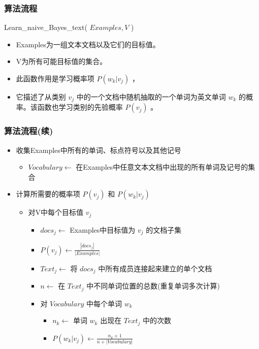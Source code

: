 \documentclass{beamer}
\begin{document}
\begin{frame}
\frametitle{算法流程}
\label{sec-7-10}

Learn\_{}naive\_{}Bayes\_{}text( $Examples, V$ )
\begin{itemize}
\item Examples为一组文本文档以及它们的目标值。
\item V为所有可能目标值的集合。
\item 此函数作用是学习概率项 $P(w_k|v_j)$ ，
\item 它描述了从类别 $v_j$ 中的一个文档中随机抽取的一个单词为英文单词 $w_k$ 的概率。该函数也学习类别的先验概率 $P(v_j)$ 。
\end{itemize}
\end{frame}
\begin{frame}
\frametitle{算法流程(续)}
\label{sec-7-11}

\begin{itemize}
\item 收集Examples中所有的单词、标点符号以及其他记号
\begin{itemize}
\item $Vocabulary \leftarrow$ 在Examples中任意文本文档中出现的所有单词及记号的集合
\end{itemize}
\item 计算所需要的概率项 $P(v_j)$ 和 $P(w_k|v_j)$
\begin{itemize}
\item 对V中每个目标值 $v_j$
\begin{itemize}
\item $docs_{j} \leftarrow$ Examples中目标值为 $v_j$ 的文档子集
\item $P(v_{j}) \leftarrow \frac{|docs_{j}|}{|Examples|}$
\item $Text_{j} \leftarrow$ 将 $docs_j$ 中所有成员连接起来建立的单个文档
\item $n \leftarrow$ 在 $Text_j$ 中不同单词位置的总数(重复单词多次计算)
\item 对 $Vocabulary$ 中每个单词 $w_k$
\begin{itemize}
\item $n_{k} \leftarrow$ 单词 $w_k$ 出现在 $Text_j$ 中的次数
\item $P(w_{k}|v_{j}) \leftarrow \frac{n_{k} + 1}{n + |Vocabulary|}$
\end{itemize}
\end{itemize}
\end{itemize}
\end{itemize}
\end{frame}
\end{document}

